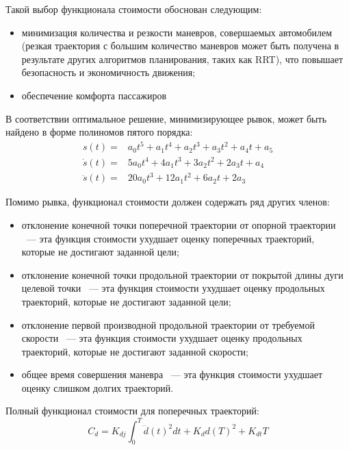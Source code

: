 Такой выбор функционала стоимости обоснован следующим:
\begin{itemize}
      \item минимизация количества и резкости маневров, совершаемых автомобилем (резкая траектория
            с большим количество маневров может быть получена в результате других алгоритмов
            планирования, таких как RRT), что повышает безопасность и экономичность движения;
      \item обеспечение комфорта пассажиров
\end{itemize}

В соответствии \cite{darpa_junior_frenet_origin} оптимальное решение, минимизирующее рывок, может быть найдено в форме
полиномов пятого порядка:
\begin{eqnarray}
      \label{eq:quntic_and_d}
      s(t)        =& a_0t^5   + a_1t^4 + a_2t^3 + a_3t^2 + a_4t + a_5 \\
      \dot{s}(t)  =& 5a_0t^4  + 4a_1t^3 + 3a_2t^2 + 2a_3t + a_4 \\
      \ddot{s}(t) =& 20a_0t^3 + 12a_1t^2 + 6a_2t + 2a_3
\end{eqnarray}

Помимо рывка, функционал стоимости должен содержать ряд других членов:
\begin{itemize}
      \item отклонение конечной точки поперечной траектории от опорной траектории ~--- эта функция стоимости
            ухудшает оценку поперечных траекторий, которые не достигают заданной цели;
      \item отклонение конечной точки продольной траектории от покрытой длины дуги целевой точки ~--- эта функция
            стоимости ухудшает оценку продольных траекторий, которые не достигают заданной цели;
      \item отклонение первой производной продольной траектории от требуемой скорости ~--- эта функция стоимости
            ухудшает оценку продольных траекторий, которые не достигают заданной скорости;
      \item общее время совершения маневра ~--- эта функция стоимости ухудшает оценку слишком долгих траекторий.
\end{itemize}

Полный функционал стоимости для поперечных траекторий:
\begin{equation}
      \label{eq:cost_lat}
      C_d = K_{dj} \int_{0}^{T}{\dddot{d}(t)^2dt} + K_d d(T)^2 + K_{dt} T
\end{equation}

